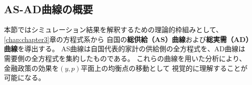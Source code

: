 
\subsection{AS-AD曲線の概要}
\label{sec:chapter5_asad_overview}
本節ではシミュレーション結果を解釈するための理論的枠組みとして、
\ref{chap:chapter3}章の方程式系から
自国の\textbf{総供給（AS）曲線}および\textbf{総実需（AD）曲線}を導出する。
AS曲線は自国代表的家計の供給側の全方程式を、AD曲線は需要側の全方程式を集約したものである。
これらの曲線を用いた分析により、金融政策の効果を\((y,p)\)平面上の均衡点の移動として
視覚的に理解することが可能になる。